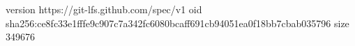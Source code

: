 version https://git-lfs.github.com/spec/v1
oid sha256:ce8fc33e1fffe9c907c7a342fc6080bcaff691cb94051ea0f18bb7cbab035796
size 349676
